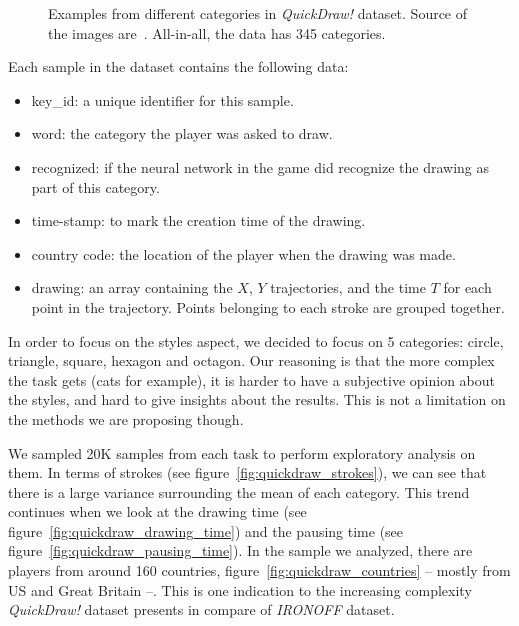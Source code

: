\begin{figure}
    \centering
    \caption{Examples from different categories in \textit{QuickDraw!} dataset. Source of the images are~\citep{quickdraw}. All-in-all, the data has 345 categories.}
    \label{fig:quickdraw_preview}
\end{figure}


\par Each sample in the dataset contains the following data:

\begin{itemize}
    \item key\_id: a unique identifier for this sample.
    \item word: the category the player was asked to draw.
    \item recognized: if the neural network in the game did recognize the drawing as part of this category.
    \item time-stamp: to mark the creation time of the drawing.
    \item country code: the location of the player when the drawing was made.
    \item drawing: an array containing the $X$, $Y$ trajectories, and the time $T$ for each point in the trajectory. Points belonging to each stroke are grouped together.
\end{itemize}

\par In order to focus on the styles aspect, we decided to focus on 5 categories: circle, triangle, square, hexagon and octagon. Our reasoning is that the more complex the task gets (cats for example), it is harder to have a subjective opinion about the styles, and hard to give insights about the results. This is not a limitation on the methods we are proposing though.

\par We sampled 20K samples from each task to perform exploratory analysis on them. In terms of strokes (see figure~\ref{fig:quickdraw_strokes}), we can see that there is a large variance surrounding the mean of each category. This trend continues when we look at the drawing time (see figure~\ref{fig:quickdraw_drawing_time}) and the pausing time (see figure~\ref{fig:quickdraw_pausing_time}). In the sample we analyzed, there are players from around 160 countries, figure~\ref{fig:quickdraw_countries} -- mostly from US and Great Britain --. This is one indication to the increasing complexity \textit{QuickDraw!} dataset presents in compare of \textit{IRONOFF} dataset.

